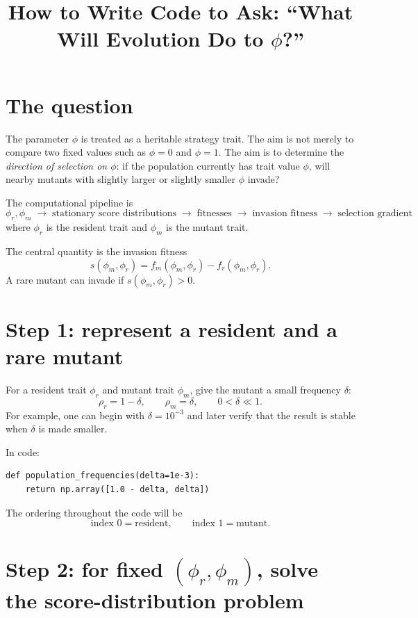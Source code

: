 \documentclass[11pt]{article}
\title{How to Write Code to Ask: ``What Will Evolution Do to $\phi$?''}
\author{}
\date{}
\begin{document}
\maketitle

\section{The question}

The parameter $\phi$ is treated as a heritable strategy trait. The aim is not merely to compare two fixed values such as $\phi=0$ and $\phi=1$. The aim is to determine the \emph{direction of selection on $\phi$}: if the population currently has trait value $\phi$, will nearby mutants with slightly larger or slightly smaller $\phi$ invade?

The computational pipeline is
\[
\boxed{
\phi_r,\phi_m
\;\longrightarrow\;
\text{stationary score distributions}
\;\longrightarrow\;
\text{fitnesses}
\;\longrightarrow\;
\text{invasion fitness}
\;\longrightarrow\;
\text{selection gradient}
}
\]
where $\phi_r$ is the resident trait and $\phi_m$ is the mutant trait.

The central quantity is the invasion fitness
\[
\boxed{
 s(\phi_m,\phi_r)
 = f_m(\phi_m,\phi_r)-f_r(\phi_m,\phi_r).
}
\]
A rare mutant can invade if $s(\phi_m,\phi_r)>0$.

\section{Step 1: represent a resident and a rare mutant}

For a resident trait $\phi_r$ and mutant trait $\phi_m$, give the mutant a small frequency $\delta$:
\[
\rho_r=1-\delta,
\qquad
\rho_m=\delta,
\qquad
0<\delta\ll 1.
\]
For example, one can begin with $\delta=10^{-3}$ and later verify that the result is stable when $\delta$ is made smaller.

In code:

\begin{lstlisting}
def population_frequencies(delta=1e-3):
    return np.array([1.0 - delta, delta])
\end{lstlisting}

The ordering throughout the code will be
\[
\text{index }0=\text{resident},
\qquad
\text{index }1=\text{mutant}.
\]

\section{Step 2: for fixed $(\phi_r,\phi_m)$, solve the score-distribution problem}
\end{document}
